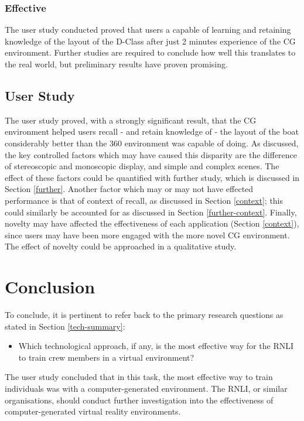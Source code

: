 \documentclass[ %
                    author={Elis Jones},
                supervisor={Dr. Kirsten Cater},
                    degree={BSc},
                     title={The Effect of Presentation Medium on Spatial Cognition},
                  subtitle={in the Virtual Environment},
                      year={2018} ]{dissertation}
\begin{document}
\subsubsection{Effective}
The user study conducted proved that users a capable of learning and retaining knowledge of the layout of the D-Class after just 2 minutes experience of the CG environment. Further studies are required to conclude how well this translates to the real world, but preliminary results have proven promising. 

\subsection{User Study}
The user study proved, with a strongly significant result, that the CG environment helped users recall - and retain knowledge of - the layout of the boat considerably better than the 360 environment was capable of doing. As discussed, the key controlled factors which may have caused this disparity are the difference of stereoscopic and monoscopic display, and simple and complex scenes. The effect of these factors could be quantified with further study, which is discussed in Section \ref{further}. Another factor which may or may not have effected performance is that of context of recall, as discussed in Section \ref{context}; this could similarly be accounted for as discussed in Section \ref{further-context}. Finally, novelty may have affected the effectiveness of each application (Section \ref{context}), since users may have been more engaged with the more novel CG environment. The effect of novelty could be approached in a qualitative study. 

\section{Conclusion}
To conclude, it is pertinent to refer back to the primary research questions as stated in Section \ref{tech-summary}:

\begin{itemize}
    \item Which technological approach, if any, is the most effective way for the RNLI to train crew members in a virtual environment?
\end{itemize}

The user study concluded that in this task, the most effective way to train individuals was with a computer-generated environment. The RNLI, or similar organisations, should conduct further investigation into the effectiveness of computer-generated virtual reality environments. 
\end{document}
